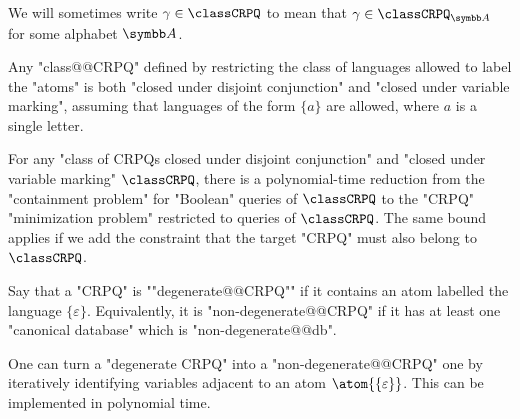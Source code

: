 We will sometimes write $\gamma \in \classCRPQ$ to mean that $\gamma\in\classCRPQ_{\A}$
for some alphabet $\A$.

\begin{fact}
	Any "class@@CRPQ" defined by restricting the class of languages allowed to
	label the "atoms" is both "closed under disjoint conjunction" and "closed under variable marking", assuming that languages of
	the form $\{a\}$ are allowed, where $a$ is a single letter.
\end{fact}

\begin{theorem}
	\AP\label{thm:reduction-containment-to-variable-minimization}
	For any "class of CRPQs closed under disjoint conjunction" and
	"closed under variable marking"
	$\classCRPQ$, there is a polynomial-time reduction
	from the "containment problem" for "Boolean" queries of $\classCRPQ$ to the "CRPQ" 
	"minimization problem" restricted to queries of $\classCRPQ$. 
	The same bound applies if we add the constraint that the target "CRPQ" must also belong to $\classCRPQ$.
\end{theorem}

Say that a "CRPQ" is \AP""degenerate@@CRPQ"" if it contains an atom labelled the language $\{\varepsilon\}$.
Equivalently, it is "non-degenerate@@CRPQ" if it has at least one "canonical database"
which is "non-degenerate@@db".

\begin{fact}
	\AP\label{fact:produce-non-degenerate}
	One can turn a "degenerate CRPQ" into a "non-degenerate@@CRPQ" one by
	iteratively identifying variables adjacent to an atom $\atom{\{\varepsilon\}}$.
	This can be implemented in polynomial time.
\end{fact}

